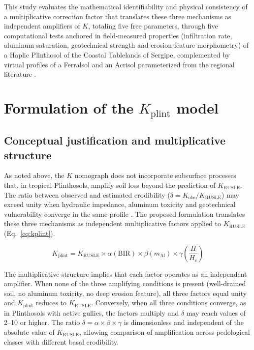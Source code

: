 \documentclass[preprint,review,12pt,authoryear]{elsarticle}
\begin{document}
This study evaluates the mathematical identifiability and physical consistency of a multiplicative correction factor that translates these three mechanisms as independent amplifiers of $K$, totaling five free parameters, through five computational tests anchored in field-measured properties (infiltration rate, aluminum saturation, geotechnical strength and erosion-feature morphometry) of a Haplic Plinthosol of the Coastal Tablelands of Sergipe, complemented by virtual profiles of a Ferralsol and an Acrisol parameterized from the regional literature \citep{silva_et_al_2009,bertoni_lombardi_neto_2017}.

\section{Formulation of the $K_{\mathrm{plint}}$ model}
\label{sec:model}

\subsection{Conceptual justification and multiplicative structure}

As noted above, the $K$ nomograph does not incorporate subsurface processes that, in tropical Plinthosols, amplify soil loss beyond the prediction of $K_{\mathrm{RUSLE}}$. The ratio between observed and estimated erodibility ($\delta = K_{\mathrm{obs}}/K_{\mathrm{RUSLE}}$) may exceed unity when hydraulic impedance, aluminum toxicity and geotechnical vulnerability converge in the same profile \citep{poesen_2018}. The proposed formulation translates these three mechanisms as independent multiplicative factors applied to $K_{\mathrm{RUSLE}}$ (Eq.~\ref{eq:kplint}).

\begin{equation}
K_{\mathrm{plint}} = K_{\mathrm{RUSLE}} \times \alpha(\mathrm{BIR}) \times \beta(m_{\mathrm{Al}}) \times \gamma\!\left(\frac{H}{H_c}\right)
\label{eq:kplint}
\end{equation}

The multiplicative structure implies that each factor operates as an independent amplifier. When none of the three amplifying conditions is present (well-drained soil, no aluminum toxicity, no deep erosion feature), all three factors equal unity and $K_{\mathrm{plint}}$ reduces to $K_{\mathrm{RUSLE}}$. Conversely, when all three conditions converge, as in Plinthosols with active gullies, the factors multiply and $\delta$ may reach values of 2--10 or higher. The ratio $\delta = \alpha \times \beta \times \gamma$ is dimensionless and independent of the absolute value of $K_{\mathrm{RUSLE}}$, allowing comparison of amplification across pedological classes with different basal erodibility.
\end{document}
